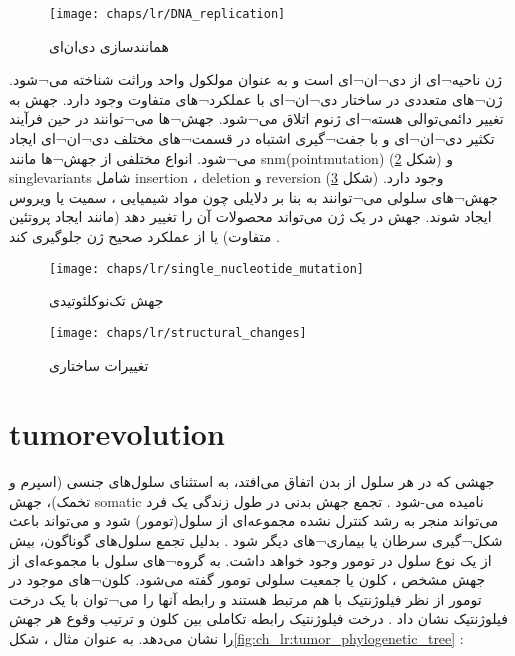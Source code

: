 \begin{figure}[!ht]
	\centerline{\texttt{[image: chaps/lr/DNA\_replication]}}
	\caption{همانندسازی دی‌ان‌ای}
	\label{fig:ch_lr:DNA_replication}
\end{figure}





ژن ناحیه¬ای از دی¬ان¬ای است و به عنوان مولکول واحد وراثت شناخته می¬شود. ژن¬های متعددی در ساختار دی¬ان¬ای با عملکرد¬های متفاوت وجود دارد. جهش به تغییر دائمی‌توالی هسته¬ای ژنوم اتلاق می¬شود. جهش¬ها می¬توانند در حین فرآیند تکثیر دی¬ان¬ای و با جفت¬گیری اشتباه در قسمت¬های مختلف دی¬ان¬ای ایجاد می¬شود. انواع مختلفی از جهش¬ها مانند \gls{snm}(\gls{pointmutation})  (شکل \ref{fig:ch_lr:single_nucleotide_mutation}) و  \glspl{singlevariant}  شامل \gls{insertion}  ، \gls{deletion}  و \gls{reversion}  (شکل \ref{fig:ch_lr:structural_changes}) وجود دارد. جهش¬های سلولی می¬توانند به بنا بر دلایلی چون مواد شیمیایی ، سمیت یا ویروس ایجاد شوند. جهش در یک ژن می‌تواند محصولات آن را تغییر دهد (مانند ایجاد پروتئین متفاوت) یا از عملکرد صحیح ژن جلوگیری کند \cite{alberts2002molecular}.




\begin{figure}[!ht]
	\centerline{\texttt{[image: chaps/lr/single\_nucleotide\_mutation]}}
	\caption{جهش تک‌نوکلئوتیدی}
	\label{fig:ch_lr:single_nucleotide_mutation}
\end{figure}



\begin{figure}[!ht]
	\centerline{\texttt{[image: chaps/lr/structural\_changes]}}
	\caption{تغییرات ساختاری}
	\label{fig:ch_lr:structural_changes}
\end{figure}




\section{\gls{tumorevolution}}


جهشی که در هر سلول از بدن اتفاق می‌افتد، به استثنای سلول‌های جنسی (اسپرم و تخمک)، جهش \gls{somatic}  نامیده می-شود \cite{somaticMutation}. تجمع جهش بدنی در طول زندگی یک فرد می‌تواند منجر به رشد کنترل نشده مجموعه‌ای از سلول(تومور) شود \cite{nowell1976clonal} و می‌تواند باعث شکل¬گیری سرطان یا بیماری¬های دیگر شود \cite{somaticMutation}. بدلیل تجمع سلول‌های گوناگون، بیش از یک نوع سلول در تومور وجود خواهد داشت. به گروه¬های سلول با مجموعه‌ای از جهش مشخص ، کلون یا جمعیت سلولی تومور گفته می‌شود. کلون¬های موجود در تومور از نظر فیلوژنتیک با هم مرتبط هستند و رابطه آنها را می¬توان با یک درخت فیلوژنتیک نشان داد \cite{birbrair2014type}. درخت فیلوژنتیک رابطه تکاملی بین کلون و ترتیب وقوع هر جهش را نشان می‌دهد. به عنوان مثال ، شکل\ref{fig:ch_lr:tumor_phylogenetic_tree} :

